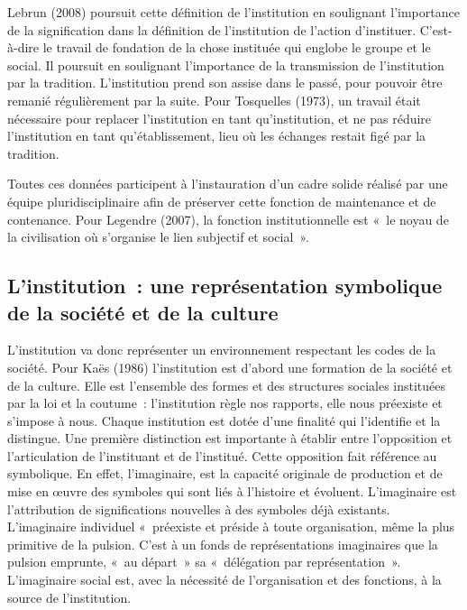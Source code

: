 \documentclass[12pt, a4paper]{book}
\begin{document}
\begin{spacing}{1.5}
Lebrun (2008) poursuit cette définition de l'institution en soulignant l'importance de la  signification dans la définition de l'institution de l'action d'instituer. C'est-à-dire le travail de fondation  de la chose instituée qui englobe le groupe  et le social. Il poursuit en soulignant l'importance de la transmission de l'institution par la tradition. L'institution prend son assise dans le passé, pour pouvoir être remanié régulièrement par la suite. Pour Tosquelles (1973), un travail était nécessaire pour replacer l'institution en tant qu'institution, et ne pas réduire l'institution en tant qu'établissement, lieu où les échanges restait figé par la tradition. 

Toutes ces données participent à l'instauration d'un cadre solide réalisé par une équipe pluridisciplinaire afin de préserver cette fonction de maintenance et de contenance. Pour Legendre (2007), la fonction institutionnelle est « le noyau de la civilisation où s'organise le lien subjectif et social ». 

\subsection{L'institution : une représentation symbolique de la société et de la culture}

L'institution va donc représenter un environnement respectant les codes de la société. Pour Kaës (1986) l'institution est d'abord une formation de la société et de la culture. Elle est l'ensemble des formes et des structures sociales instituées par la loi et la coutume : l'institution règle nos rapports, elle nous préexiste et s'impose à nous. Chaque institution est dotée d'une finalité qui l'identifie et la distingue. Une première distinction est importante à établir entre l'opposition et l'articulation de l'instituant et de l'institué. Cette opposition fait référence au symbolique. En effet, l'imaginaire, est la capacité originale de production et de mise en œuvre des symboles qui sont liés à l'histoire et évoluent. L'imaginaire est l'attribution de significations nouvelles à des symboles déjà existants. L'imaginaire individuel « préexiste et préside à toute organisation, même la plus primitive de la pulsion. C'est à un fonds de représentations imaginaires que la pulsion emprunte, « au départ » sa « délégation par représentation ». L'imaginaire social est, avec la nécessité de l'organisation et des fonctions, à la source de l'institution.


\end{spacing}
\end{document}
